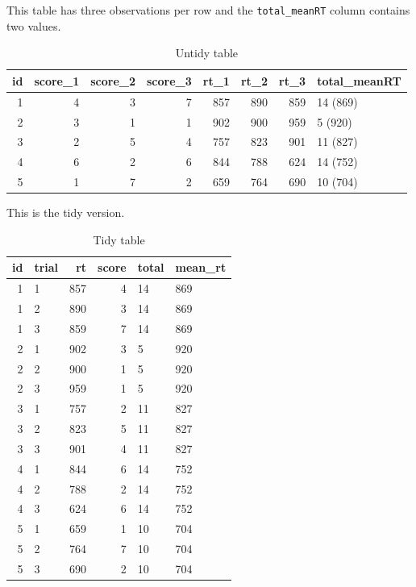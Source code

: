 \documentclass[
  oneside]{book}
\begin{document}
This table has three observations per row and the \texttt{total\_meanRT} column contains two values.

\begin{table}

\caption{\label{tab:unnamed-chunk-1}Untidy table}
\centering
\begin{tabular}[t]{r|r|r|r|r|r|r|l}
\hline
id & score\_1 & score\_2 & score\_3 & rt\_1 & rt\_2 & rt\_3 & total\_meanRT\\
\hline
1 & 4 & 3 & 7 & 857 & 890 & 859 & 14 (869)\\
\hline
2 & 3 & 1 & 1 & 902 & 900 & 959 & 5 (920)\\
\hline
3 & 2 & 5 & 4 & 757 & 823 & 901 & 11 (827)\\
\hline
4 & 6 & 2 & 6 & 844 & 788 & 624 & 14 (752)\\
\hline
5 & 1 & 7 & 2 & 659 & 764 & 690 & 10 (704)\\
\hline
\end{tabular}
\end{table}

This is the tidy version.

\begin{table}

\caption{\label{tab:unnamed-chunk-1}Tidy table}
\centering
\begin{tabular}[t]{r|l|r|r|l|l}
\hline
id & trial & rt & score & total & mean\_rt\\
\hline
1 & 1 & 857 & 4 & 14 & 869\\
\hline
1 & 2 & 890 & 3 & 14 & 869\\
\hline
1 & 3 & 859 & 7 & 14 & 869\\
\hline
2 & 1 & 902 & 3 & 5 & 920\\
\hline
2 & 2 & 900 & 1 & 5 & 920\\
\hline
2 & 3 & 959 & 1 & 5 & 920\\
\hline
3 & 1 & 757 & 2 & 11 & 827\\
\hline
3 & 2 & 823 & 5 & 11 & 827\\
\hline
3 & 3 & 901 & 4 & 11 & 827\\
\hline
4 & 1 & 844 & 6 & 14 & 752\\
\hline
4 & 2 & 788 & 2 & 14 & 752\\
\hline
4 & 3 & 624 & 6 & 14 & 752\\
\hline
5 & 1 & 659 & 1 & 10 & 704\\
\hline
5 & 2 & 764 & 7 & 10 & 704\\
\hline
5 & 3 & 690 & 2 & 10 & 704\\
\hline
\end{tabular}
\end{table}
\end{document}
